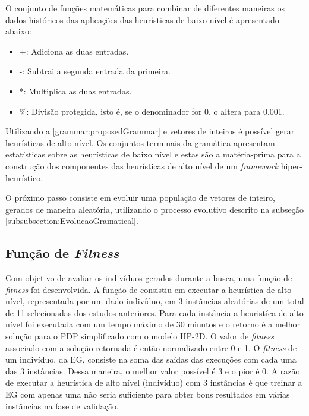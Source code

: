  
  
  O conjunto de funções matemáticas para combinar de diferentes maneiras os dados históricos das aplicações das heurísticas de baixo nível é apresentado abaixo:
  
  \begin{itemize}
  	\item +: Adiciona as duas entradas.
  	\item -: Subtrai a segunda entrada da primeira.
  	\item *: Multiplica as duas entradas.
  	\item \%: Divisão protegida, isto é, se o denominador for 0, o altera para 0,001.
  \end{itemize}
  
  
  Utilizando a \ref{grammar:proposedGrammar} e vetores de inteiros é possível gerar heurísticas de alto nível. Os conjuntos terminais da gramática apresentam estatísticas sobre as heurísticas de baixo nível e estas são a matéria-prima para a construção dos componentes das heurísticas de alto nível de um \textit{framework} hiper-heurístico. 
  
  

  
  O próximo passo consiste em evoluir uma população de vetores de inteiro, gerados de maneira aleatória, utilizando o processo evolutivo descrito na subseção 
  \ref{subsubsection:EvolucaoGramatical}. %
  
  
  \subsection{Função de \textit{Fitness}}
  
 Com objetivo de avaliar os indivíduos gerados durante a busca, uma função de \textit{fitness} foi desenvolvida. A função de consistiu em executar a heurística de alto nível, representada por um dado indivíduo, em 3 instâncias aleatórias de um total de 11 selecionadas dos estudos anteriores. Para cada instância a heuristíca de alto nível foi executada com um tempo máximo de 30 minutos e o retorno é a melhor solução para o PDP simplificado com o modelo HP-2D. O valor de \textit{fitness} associado com a solução retornada é então normalizado entre 0 e 1. O \textit{fitness} de um indivíduo, da EG, consiste na soma das saídas das execuções com cada uma das 3 instâncias. Dessa maneira, o melhor valor possível é 3 e o pior é 0. A razão de executar a heurística de alto nível (indivíduo) com 3 instâncias é que treinar a EG com apenas uma não seria suficiente para obter bons resultados em várias instâncias na fase de validação. 
 

